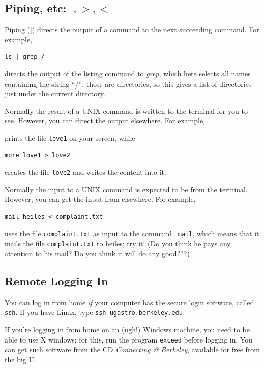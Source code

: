 \documentclass[]{article}
\begin{document}
\subsection{Piping, etc: $|, >, <$}\label{help}

	Piping ($|$)  directs the output of a command to the next succeeding
command.  For example,

\begin{verbatim}
ls | grep /
\end{verbatim}

\noindent directs the output of the listing command to {\it grep}, which
here selects all names containing the string ``/''; those are
directories, so this gives a list of directories just under the current
directory. 

	Normally the result of a UNIX command is written to the terminal
for you to see. However, you can direct the output elsewhere. For
example, 


\noindent prints the file {\tt love1} on your screen, while

\begin{verbatim}
more love1 > love2
\end{verbatim}
 
\noindent creates the file {\tt love2} and writes the content into it.

	Normally the input to a UNIX command is expected to be from the
terminal. However, you can get the input from elsewhere. For example, 

\begin{verbatim}
mail heiles < complaint.txt
\end{verbatim}

\noindent uses the file {\tt complaint.txt} as input to the command {\tt
  mail}, which means that it mails the file {\tt complaint.txt} to
  heiles; try it! (Do you think he pays any attention to his mail? Do
  you think it will do any good???)

\subsection{Remote Logging In}\label{remote}

	You can log in from home {\it if} your computer has the secure
login software, called {\tt ssh}. 
If you have Linux, type {\tt ssh ugastro.berkeley.edu}

If you're logging in from home on an (ugh!) Windows machine, you need to
be able to use X windows; for this, run the program {\tt exceed} before
logging in. You can get such software from the CD {\it Connecting @
Berkeley}, available for free from the big U.
\end{document}
